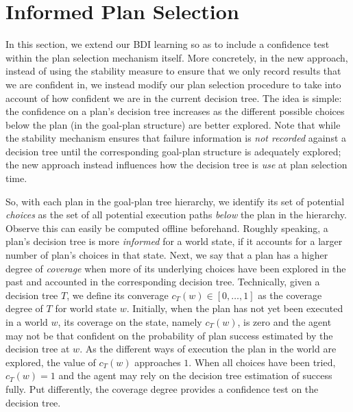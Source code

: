 \section{Informed Plan Selection}\label{sec:coverage}

In this section, we extend our BDI learning so as to include a confidence test
within the plan selection mechanism itself. More concretely, in the new approach,
instead of using the stability measure to ensure that we only record results that
we are confident in, we instead modify our plan selection procedure to take into
account of how confident we are in the current decision tree.
The idea is simple: the confidence on a plan's decision tree increases as the
different possible choices below the plan (in the goal-plan structure) are better
explored.
Note that while the stability mechanism ensures that failure information is
\emph{not recorded} against a decision tree until the corresponding goal-plan
structure is adequately explored; the new approach instead influences how the
decision tree is \emph{use} at plan selection time.


So, with each plan in the goal-plan tree hierarchy, we identify its set of
potential \textit{choices} as the set of all potential execution paths
\textit{below} the plan in the hierarchy. Observe this can easily be computed
offline beforehand.
Roughly speaking, a plan's decision tree is more \textit{informed} for a world
state, if it accounts for a larger number of plan's choices in that state.
Next, we say that a plan has a higher degree of \emph{coverage} when more of its
underlying choices have been explored in the past and accounted in the
corresponding decision tree.
Technically, given a decision tree $T$, we define its converage $c_T(w) \in
[0,\ldots,1]$ as the coverage degree of $T$ for world state $w$.
Initially, when the plan has not yet been executed in a world $w$, its coverage
on the state, namely $c_T(w)$, is zero and the agent may not be that confident on
the probability of plan success estimated by the decision tree at $w$. As the
different ways of execution the plan in the world are explored, the value of
$c_T(w)$ approaches $1$. When all choices have been tried, $c_T(w)=1$ and the
agent may rely on the decision tree estimation of success fully.
Put differently, the coverage degree provides a confidence test on the decision
tree.




